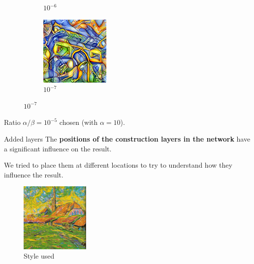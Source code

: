 \documentclass[12pt]{beamer}
\begin{document}
\begin{frame}
\begin{figure}[ht]
\begin{subfigure}[b]{0.25\textwidth}
                \caption{$10^{-6}$}
            \end{subfigure}
            \hfill
            \begin{subfigure}[b]{0.25\textwidth}
                \centering
                \includegraphics[width=\textwidth]{resources/gatys/weights/sun-trees-paris-10-7.png}
                \caption{$10^{-7}$}
            \end{subfigure}
        \end{figure}
        
        \footnotesize{Ratio $\alpha/\beta = 10^{-5}$ chosen (with $\alpha = 10$).}
    \end{frame}
    
    \begin{frame}{Added layers}
        The \textbf{positions of the construction layers in the network} have a significant influence on the result.
        
        We tried to place them at different locations to try to understand how they influence the result.
        \begin{figure}[H]
            \centering
            \includegraphics[width=0.3\textwidth]{resources/gatys/inputs/church.png}
            \caption*{Style used}
        \end{figure}
    \end{frame}
    
\end{document}
